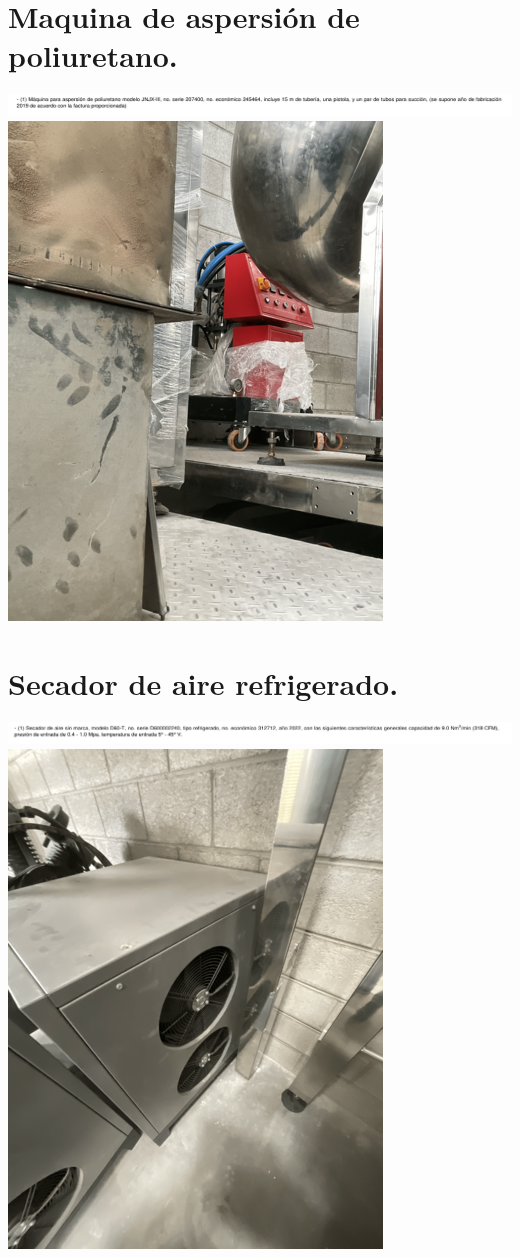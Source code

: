 \documentclass{article}
\begin{document}

\section{Maquina de aspersión de poliuretano.} %
\includegraphics[width=  \linewidth]{images/decript/9.png}
\includegraphics[width=  .5\linewidth]{images/foto/9.png}



\section{Secador de aire refrigerado.} %
\includegraphics[width=  \linewidth]{images/decript/10.png}
\includegraphics[width=  .5\linewidth]{images/foto/10.png}
\end{document}

